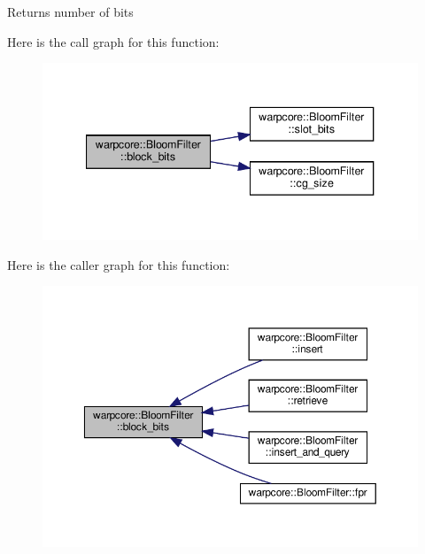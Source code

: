 \begin{DoxyReturn}{Returns}
number of bits 
\end{DoxyReturn}
Here is the call graph for this function\+:
\nopagebreak
\begin{figure}[H]
\begin{center}
\leavevmode
\includegraphics[width=340pt]{classwarpcore_1_1BloomFilter_ae7d326580b41b88db73264a494db3a06_cgraph}
\end{center}
\end{figure}
Here is the caller graph for this function\+:
\nopagebreak
\begin{figure}[H]
\begin{center}
\leavevmode
\includegraphics[width=350pt]{classwarpcore_1_1BloomFilter_ae7d326580b41b88db73264a494db3a06_icgraph}
\end{center}
\end{figure}
\mbox{\label{classwarpcore_1_1BloomFilter_a6ad2335811852ad62fc65e85416d3904}} 
